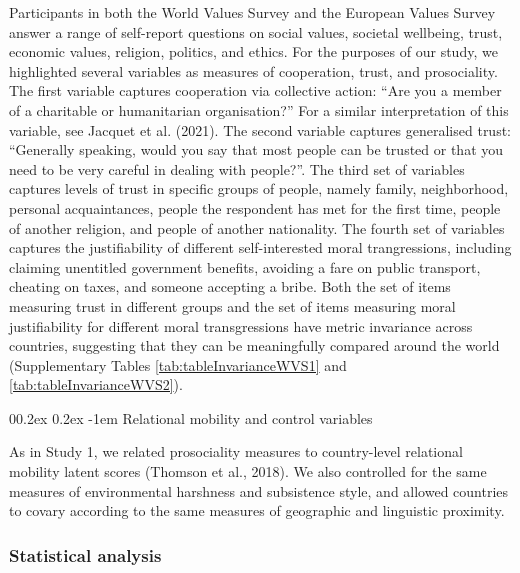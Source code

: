 \documentclass[
  man,floatsintext]{apa6}
\makeatletter
\let\oldparagraph\paragraph
\renewcommand{\paragraph}[1]{\oldparagraph{#1}\mbox{}}
\renewcommand{\paragraph}{\@startsection{paragraph}{4}{\parindent}%
  {0\baselineskip \@plus 0.2ex \@minus 0.2ex}%
  {-1em}%
  {\normalfont\normalsize\bfseries\itshape\typesectitle}}
\makeatother
\begin{document}
Participants in both the World Values Survey and the European Values Survey answer a range of self-report questions on social values, societal wellbeing, trust, economic values, religion, politics, and ethics. For the purposes of our study, we highlighted several variables as measures of cooperation, trust, and prosociality. The first variable captures cooperation via collective action: ``Are you a member of a charitable or humanitarian organisation?'' For a similar interpretation of this variable, see Jacquet et al. (2021). The second variable captures generalised trust: ``Generally speaking, would you say that most people can be trusted or that you need to be very careful in dealing with people?''. The third set of variables captures levels of trust in specific groups of people, namely family, neighborhood, personal acquaintances, people the respondent has met for the first time, people of another religion, and people of another nationality. The fourth set of variables captures the justifiability of different self-interested moral trangressions, including claiming unentitled government benefits, avoiding a fare on public transport, cheating on taxes, and someone accepting a bribe. Both the set of items measuring trust in different groups and the set of items measuring moral justifiability for different moral transgressions have metric invariance across countries, suggesting that they can be meaningfully compared around the world (Supplementary Tables \ref{tab:tableInvarianceWVS1} and \ref{tab:tableInvarianceWVS2}).

\hypertarget{relational-mobility-and-control-variables}{%
\paragraph{Relational mobility and control variables}\label{relational-mobility-and-control-variables}}

As in Study 1, we related prosociality measures to country-level relational mobility latent scores (Thomson et al., 2018). We also controlled for the same measures of environmental harshness and subsistence style, and allowed countries to covary according to the same measures of geographic and linguistic proximity.

\hypertarget{statistical-analysis-1}{%
\subsubsection{Statistical analysis}\label{statistical-analysis-1}}
\end{document}
